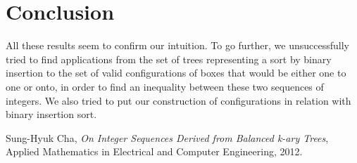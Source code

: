 \documentclass[11pt, a4paper]{article}
\begin{document}
\section{Conclusion}

All these results seem to confirm our intuition.  To go further, we
unsuccessfully tried to find applications from the set of trees representing a
sort by binary insertion to the set of valid configurations of boxes that would
be either one to one or onto, in order to find an inequality between these two
sequences of integers.  We also tried to put our construction of configurations
in relation with binary insertion sort. 

\begin{thebibliography}{1}

Sung-Hyuk Cha, {\em On Integer Sequences Derived from Balanced k-ary Trees}, Applied Mathematics in Electrical and Computer Engineering, 2012.

\end{thebibliography}
\end{document}
